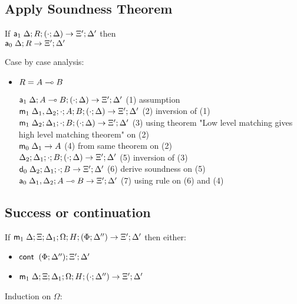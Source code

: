 \subsection{Apply Soundness Theorem}

If $\mathsf{a}_1 \; \Delta; R; (\cdot; \Delta) \rightarrow \Xi'; \Delta'$ then \\
      $\mathsf{a}_0 \; \Delta; R \rightarrow \Xi'; \Delta'$

Case by case analysis:

\begin{itemize}
\item $R = A \multimap B$

$\mathsf{a}_1 \; \Delta; A \multimap B ; (\cdot ; \Delta) \rightarrow \Xi'; \Delta'$ \hfill (1) assumption \\
$\mathsf{m}_1 \; \Delta_1, \Delta_2; \cdot; A ; B ; (\cdot ; \Delta) \rightarrow \Xi'; \Delta'$ \hfill (2) inversion of (1) \\
$\mathsf{m}_1 \; \Delta_2; \Delta_1; \cdot ; B ; (\cdot ; \Delta) \rightarrow \Xi'; \Delta'$ \hfill (3) using theorem "Low level matching gives high level matching theorem" on (2) \\
$\mathsf{m}_0 \; \Delta_1 \rightarrow A$ \hfill (4) from same theorem on (2) \\
$\do \Delta_2; \Delta_1; \cdot ; B ; (\cdot ; \Delta) \rightarrow \Xi'; \Delta'$ \hfill (5) inversion of (3) \\
$\mathsf{d}_0 \; \Delta_2; \Delta_1; \cdot ; B \rightarrow \Xi'; \Delta'$ \hfill (6) derive soundness on (5) \\
$\mathsf{a}_0 \; \Delta_1, \Delta_2; A \multimap B \rightarrow \Xi'; \Delta'$ \hfill (7) using rule on (6) and (4) \\
\end{itemize}

\subsection{Success or continuation}

If $\mathsf{m}_1 \; \Delta; \Xi; \Delta_1; \Omega; H; (\Phi; \Delta'') \rightarrow \Xi'; \Delta'$ then either:

\begin{itemize}
   \item $\mathsf{cont} \; \; (\Phi; \Delta''); \Xi'; \Delta'$
   \item $\mathsf{m}_1 \; \Delta; \Xi; \Delta_1; \Omega; H; (\cdot; \Delta'') \rightarrow \Xi'; \Delta'$
\end{itemize}

Induction on $\Omega$:

